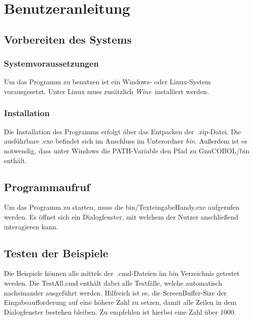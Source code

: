\chapter{Benutzeranleitung}\label{ch:benutzeranleitung}


\section{Vorbereiten des Systems}\label{sec:vorbereiten-des-systems}

\subsection{Systemvoraussetzungen}\label{subsec:systemvoraussetzungen}
Um das Programm zu benutzen ist ein Windows- oder Linux-System vorausgesetzt.
Unter Linux muss zusätzlich \textit{Wine}~installiert werden.

\subsection{Installation}\label{subsec:installation}
Die Installation des Programms erfolgt über das Entpacken der~.zip-Datei.
Die ausführbare .exe befindet sich im Anschluss im Unterordner \textit{bin}.
Außerdem ist es notwendig, dass unter Windows die PATH-Variable den Pfad zu GnuCOBOL/bin enthält.

\section{Programmaufruf}\label{sec:programmaufruf}
Um das Programm zu starten, muss die bin/TexteingabeHandy.exe aufgerufen werden.
Es öffnet sich ein Dialogfenster, mit welchem der Nutzer anschließend interagieren kann.


\section{Testen der Beispiele}\label{sec:testen-der-beispiele}
Die Beispiele können alle mittels der~.cmd-Dateien im bin Verzeichnis getestet werden.
Die TestAll.cmd enthält dabei alle Testfälle, welche automatisch nacheinander ausgeführt werden.
Hilfreich ist es, die ScreenBuffer-Size der Eingabeaufforderung auf eine höhere Zahl zu setzen, damit alle Zeilen in dem Dialogfenster bestehen bleiben.
Zu empfehlen ist hierbei eine Zahl über 1000.